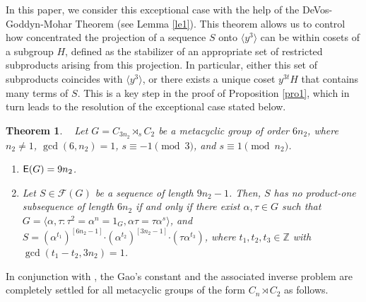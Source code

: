 \documentclass[leqno,a4paper]{amsart}
\def\E{{\sf E}}
\def\F{{\mathcal F}}
\def\bd{{\boldsymbol{\cdot}}}
\def\Z{\mathbb Z}
\theoremstyle{plain}
\newtheorem{theorem}{Theorem}[section]
\theoremstyle{definition}
\numberwithin{equation}{section}
\begin{document}
		
	In this paper, we consider this exceptional case with the help of the DeVos-Goddyn-Mohar Theorem (see Lemma \ref{le1}). This theorem allows us to control how concentrated the projection of a sequence $S$ onto $\langle y^3 \rangle$ can be within cosets of a subgroup $H$, defined as the stabilizer of an appropriate set of restricted subproducts arising from this projection. In particular, either this set of subproducts coincides with $\langle y^3 \rangle$, or there exists a unique coset $y^{3t}H$ that contains many terms of $S$. This is a key step in the proof of Proposition \ref{pro1}, which in turn leads to the resolution of the exceptional case stated below.
	
	
	
		\smallskip
		\begin{theorem} \label{thm:main}~
		Let $G = C_{3n_2} \rtimes_s C_2$ be a metacyclic group of order $6n_2$, where $n_2\neq 1$, $\gcd(6, n_2) = 1$,  $s \equiv -1 \pmod{3}$, and $s \equiv 1 \pmod{n_2}$.
			\begin{enumerate}
			\item $\E(G) = 9n_2$.
		
			\smallskip
			\item Let $S \in \F(G)$ be a sequence of length $9n_2-1$. Then, $S$ has no product-one subsequence of length $6n_2$ if and only if there exist $\alpha, \tau \in G$ such that $G = \langle \alpha, \tau \colon \tau^2 = \alpha^n = 1_G, \alpha \tau = \tau \alpha^s \rangle$,  and $S = (\alpha^{t_1})^{[6n_2-1]} \bd (\alpha^{t_2})^{[3n_2-1]} \bd (\tau \alpha^{t_3})$, where $t_1, t_2, t_3 \in \Z$ with $\gcd(t_1-t_2,3n_2) = 1$.
			\end{enumerate}
		\end{theorem}
		
		\smallskip
		 In conjunction with \cite[Theorems 1.6 and 1.7]{AMR}, the Gao's constant and the associated inverse problem are completely settled for all metacyclic groups of the form $C_n \rtimes C_2$ as follows.
		
\end{document}
